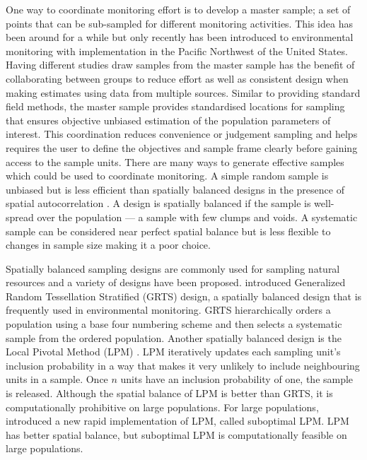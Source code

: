 \documentclass[titlepage]{article}
\begin{document}
One way to coordinate monitoring effort is to develop a master sample; a set of points that can be sub-sampled for different monitoring activities. This idea has been around for a while \citep{King1945} but only recently has been introduced to environmental monitoring \citep{LarsenOlsenStevens2008, theobald2016} with implementation in the Pacific Northwest of the United States. Having different studies draw samples from the master sample has the benefit of collaborating between groups to reduce effort as well as consistent design when making estimates using data from multiple sources. Similar to providing standard field methods, the master sample provides standardised locations for sampling that ensures objective unbiased estimation of the population parameters of interest. This coordination reduces convenience or judgement sampling and helps requires the user to define the objectives and sample frame clearly before gaining access to the sample units. There are many ways to generate effective samples which could be used to coordinate monitoring. A simple random sample is unbiased but is less efficient than spatially balanced designs in the presence of spatial autocorrelation \citep{Grafstrom2013}. A design is spatially balanced if the sample is well-spread over the population --- a sample with few clumps and voids. A systematic sample can be considered near perfect spatial balance but is  less flexible to changes in sample size making it a poor choice.

Spatially balanced sampling designs are commonly used for sampling natural resources and a variety of designs have been proposed. \cite{StevensOlsen2004} introduced Generalized Random Tessellation Stratified (GRTS) design, a spatially balanced design that is frequently used in environmental monitoring. GRTS hierarchically orders a population using a base four numbering scheme and then selects a systematic sample from the ordered population. Another spatially balanced design is the Local Pivotal Method (LPM) \citep{Grafstrom2012}. LPM iteratively updates each sampling unit's inclusion probability in a way that makes it very unlikely to include neighbouring units in a sample. Once $n$ units have an inclusion probability of one, the sample is released. Although the spatial balance of LPM is better than GRTS, it is computationally prohibitive on large populations. For large populations, \cite{Grafstrom2014} introduced a new rapid implementation of LPM, called suboptimal LPM. LPM has better spatial balance, but suboptimal LPM is computationally feasible on large populations.
\end{document}
